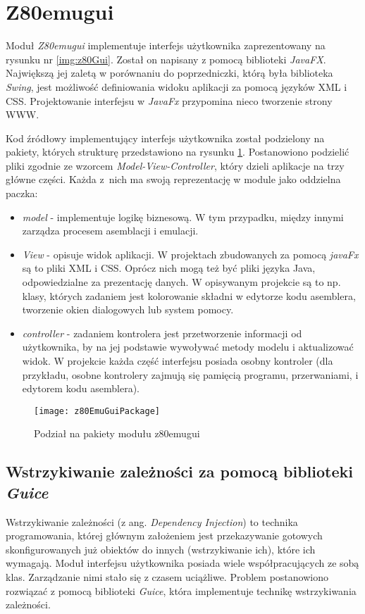 \section{Z80emu{\dywiz}gui}

Moduł \emph{Z80emu{\dywiz}gui} implementuje interfejs użytkownika zaprezentowany na rysunku nr \ref{img:z80Gui}. Został on napisany z pomocą biblioteki \emph{JavaFX}. Największą jej zaletą w porównaniu do poprzedniczki, którą była biblioteka \emph{Swing}, jest możliwość definiowania widoku aplikacji za pomocą języków XML i CSS. Projektowanie interfejsu w \emph{JavaFx} przypomina nieco tworzenie strony WWW.

Kod źródłowy implementujący interfejs użytkownika został podzielony na pakiety, których strukturę przedstawiono na rysunku \ref{img:z80EmuGuiPackage}. Postanowiono podzielić pliki zgodnie ze wzorcem \emph{Model-View-Controller}, który dzieli aplikacje na trzy główne części. Każda z~nich ma swoją reprezentację w module jako oddzielna paczka:
\begin{itemize}
    \item \emph{model} - implementuje logikę biznesową. W tym przypadku, między innymi zarządza procesem asemblacji i emulacji.
    \item \emph{View} - opisuje widok aplikacji. W projektach zbudowanych za pomocą \emph{javaFx} są to pliki XML i CSS. Oprócz nich mogą też być pliki języka Java, odpowiedzialne za prezentację danych. W opisywanym projekcie są to np. klasy, których zadaniem jest kolorowanie składni w edytorze kodu asemblera, tworzenie okien dialogowych lub system pomocy.
    \item \emph{controller} - zadaniem kontrolera jest przetworzenie informacji od użytkownika, by na jej podstawie wywoływać metody modelu i aktualizować widok. W projekcie każda część interfejsu posiada osobny kontroler (dla przykładu, osobne kontrolery zajmują się pamięcią programu, przerwaniami, i edytorem kodu asemblera).
\end{itemize}

\begin{figure}[h]
		\centering
		\texttt{[image: z80EmuGuiPackage]}
		\caption{Podział na pakiety modułu z80emu{\dywiz}gui}
		\label{img:z80EmuGuiPackage}
\end{figure}



\subsection{Wstrzykiwanie zależności za pomocą biblioteki \emph{Guice}}
Wstrzykiwanie zależności (z ang. \emph{Dependency Injection}) to technika programowania, której głównym założeniem jest przekazywanie gotowych skonfigurowanych już obiektów do innych (wstrzykiwanie ich), które ich wymagają. Moduł interfejsu użytkownika posiada wiele współpracujących ze sobą  klas. Zarządzanie nimi stało się z czasem uciążliwe. Problem postanowiono rozwiązać z pomocą biblioteki \emph{Guice}, która implementuje technikę wstrzykiwania zależności.

